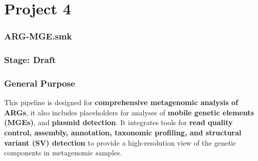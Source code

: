 \documentclass[11pt]{report}
\begin{document}
\part{Project 4}
\section*{ ARG-MGE.smk}
\section*{Stage: Draft}   
\section*{General Purpose}

This pipeline is designed for \textbf{comprehensive metagenomic analysis of ARGs}, it also includes placeholders for analyses of \textbf{mobile genetic elements (MGEs)}, and \textbf{plasmid detection}. It integrates tools for \textbf{read quality control, assembly, annotation, taxonomic profiling, and structural variant (SV) detection} to provide a high-resolution view of the genetic components in metagenomic samples.
\end{document}
